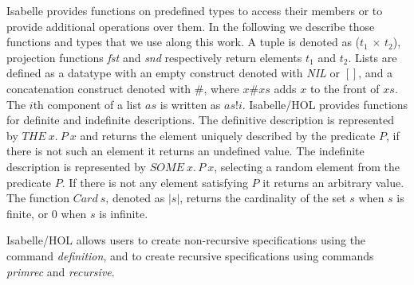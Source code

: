 Isabelle provides functions on predefined types to access their members or to provide additional operations over them. In the following we describe those functions and types that we use along this work. A tuple is denoted as (\emph{$t_1$} $\times$ \emph{$t_2$}), projection functions \emph{fst} and \emph{snd} respectively return elements $t_1$ and $t_2$. Lists are defined as a datatype with an empty construct denoted with \emph{NIL} or $[]$, and a concatenation construct denoted with $\#$, where $x\#xs$ adds $x$ to the front of $xs$. The $i$th component of a list $as$ is written as $as!i$. Isabelle/HOL provides functions for definite and indefinite descriptions. The definitive description is represented by $THE\ x.\ P\ x$ and returns the element uniquely described by the predicate $P$, if there is not such an element it returns an undefined value. The indefinite description is represented by $SOME\ x.\, P\ x$, selecting a random element from the predicate $P$. If there is not any element satisfying $P$ it returns an arbitrary value. The function $Card\ s$, denoted as $|s|$, returns the cardinality of the set $s$ when $s$ is finite, or $0$ when $s$ is infinite.

Isabelle/HOL allows users to create non-recursive specifications using the command \emph{definition}, and to create recursive specifications using commands \emph{primrec} and \emph{recursive}.
